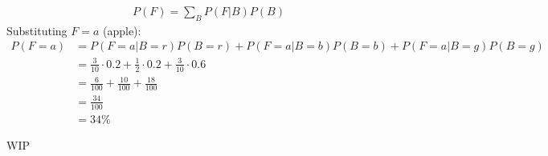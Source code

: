 \begin{problem}
  \begin{align*}
    P(F) = \sum_B P(F | B) P(B)
  \end{align*}
  Substituting $F=a$ (apple):
  \begin{align*}
    P(F=a) &= P(F=a | B=r) P(B=r) + P(F=a | B=b) P(B=b) + P(F=a | B=g) P(B=g) \\
           &= \frac{3}{10} \cdot 0.2 + \frac{1}{2} \cdot 0.2 + \frac{3}{10} \cdot 0.6 \\
           &= \frac{6}{100} + \frac{10}{100} + \frac{18}{100} \\
           &= \frac{34}{100} \\
           &= 34\%
  \end{align*}

  WIP
\end{problem}

